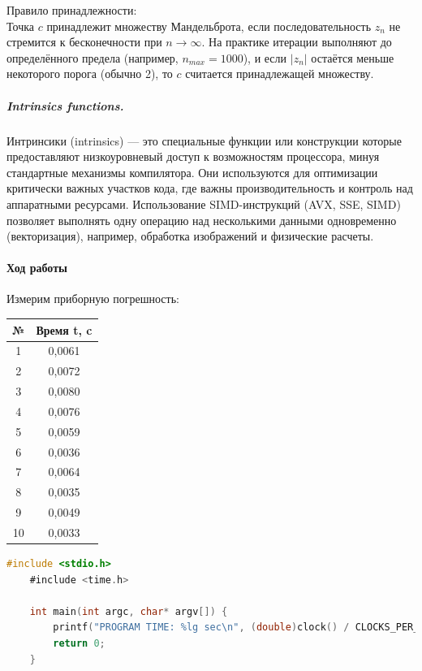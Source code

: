 \documentclass[12pt, letterpaper]{article}
\begin{document}
    Правило принадлежности:\\
    Точка $c$ принадлежит множеству Мандельброта, если последовательность $z_n$ не стремится к бесконечности при $n \to \infty$. На практике итерации выполняют до определённого предела (например, $n_{max} = 1000$), и если $\left| z_n \right|$ остаётся меньше некоторого порога (обычно 2), то $c$ считается принадлежащей множеству.

    \subparagraph{Intrinsics functions.}
    Интринсики (intrinsics) — это специальные функции или конструкции которые предоставляют низкоуровневый доступ к возможностям процессора, минуя стандартные механизмы компилятора. Они используются для оптимизации критически важных участков кода, где важны производительность и контроль над аппаратными ресурсами. Использование SIMD-инструкций (AVX, SSE, SIMD) позволяет выполнять одну операцию над несколькими данными одновременно (векторизация), например, обработка изображений и физические расчеты.

    \paragraph{Ход работы}
    Измерим приборную погрешность:\\
    \begin{table}
        \begin{tabular}{cc}
        \toprule             %
        \textbf{№} & \textbf{Время t, c} \\
        \midrule             %
        1 & 0,0061 \\
        2 & 0,0072 \\
        3 & 0,0080 \\
        4 & 0,0076 \\
        5 & 0,0059 \\
        6 & 0,0036 \\
        7 & 0,0064 \\
        8 & 0,0035 \\
        9 & 0,0049 \\
        10 & 0,0033 \\
        \bottomrule          %
        \end{tabular}
    \end{table}

    \begin{lstlisting}[language=C]
    #include <stdio.h>
    #include <time.h>

    int main(int argc, char* argv[]) {
        printf("PROGRAM TIME: %lg sec\n", (double)clock() / CLOCKS_PER_SEC);
        return 0;
    }
    \end{lstlisting}
\end{document}

